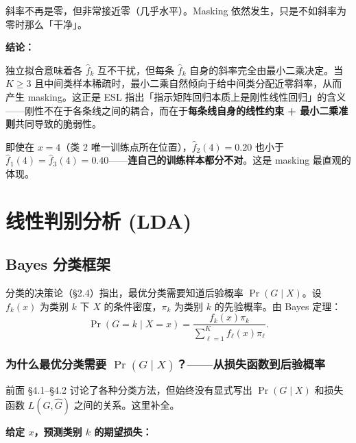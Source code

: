 斜率不再是零，但非常接近零（几乎水平）。Masking 依然发生，只是不如斜率为零时那么「干净」。

\medskip
\noindent\textbf{结论：}

\begin{center}
\end{center}

独立拟合意味着各 $\hat{f}_k$ 互不干扰，但每条 $\hat{f}_k$ 自身的斜率完全由最小二乘决定。当 $K \geq 3$ 且中间类样本稀疏时，最小二乘自然倾向于给中间类分配近零斜率，从而产生 masking。这正是 ESL 指出「指示矩阵回归本质上是刚性线性回归」的含义——刚性不在于各条线之间的耦合，而在于\textbf{每条线自身的线性约束 + 最小二乘准则}共同导致的脆弱性。

\begin{remark}
即使在 $x=4$（类 2 唯一训练点所在位置），$\hat{f}_2(4)=0.20$ 也小于 $\hat{f}_1(4)=\hat{f}_3(4)=0.40$——\textbf{连自己的训练样本都分不对}。这是 masking 最直观的体现。
\end{remark}


\section{线性判别分析 (LDA)}

\subsection{Bayes 分类框架}

分类的决策论（§2.4）指出，最优分类需要知道后验概率 $\Pr(G \mid X)$。设 $f_k(x)$ 为类别 $k$ 下 $X$ 的条件密度，$\pi_k$ 为类别 $k$ 的先验概率。由 Bayes 定理：
\begin{equation}\label{eq:bayes_class}
    \Pr(G = k \mid X = x) = \frac{f_k(x) \pi_k}{\sum_{\ell=1}^{K} f_\ell(x) \pi_\ell}.
\end{equation}

\subsubsection{为什么最优分类需要 $\Pr(G \mid X)$？——从损失函数到后验概率}

前面 §4.1--§4.2 讨论了各种分类方法，但始终没有显式写出 $\Pr(G \mid X)$ 和损失函数 $L(G, \hat{G})$ 之间的关系。这里补全。

\medskip
\noindent\textbf{给定 $x$，预测类别 $k$ 的期望损失：}

